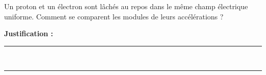Un proton et un électron sont lâchés au repos dans le même champ électrique uniforme. Comment se comparent les modules de leurs accélérations ?

\choices

\noindent\textbf{Justification :} \hrulefill \\[2.5ex]
\rule{\linewidth}{0.4pt} \\[2.5ex]
\rule{\linewidth}{0.4pt}
\vfill
